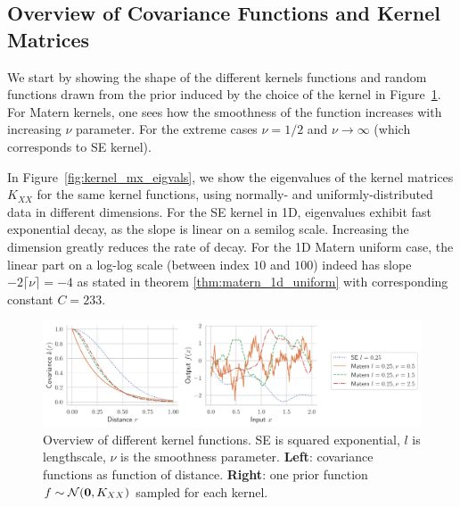 \documentclass{article}
\begin{document}
{\subsection{Overview of Covariance Functions and Kernel Matrices}

We start by showing the shape of the different kernels functions and random functions drawn from the prior induced by the choice of the kernel in Figure~\ref{fig:kernel_overview}. For Matern kernels, one sees how the smoothness of the function increases with increasing $\nu$ parameter. For the extreme cases $\nu = 1/2$ and $\nu \to \infty$ (which corresponds to SE kernel).%

In Figure~\ref{fig:kernel_mx_eigvals}, we show the eigenvalues of the kernel matrices $K_{XX}$ for the same kernel functions, using normally- and uniformly-distributed data in different dimensions. For the SE kernel in 1D, eigenvalues exhibit fast exponential decay, as the slope is linear on a semilog scale. Increasing the dimension greatly reduces the rate of decay. For the 1D Matern uniform case, the linear part on a log-log scale (between index $10$ and $100$) indeed has slope $-2\lceil \nu \rceil = -4$ as stated in theorem \ref{thm:matern_1d_uniform} with corresponding constant $C=233$. 



\begin{figure}
    \centering
    \includegraphics[width=\textwidth]{res/covariance_overview.pdf}
    \caption{Overview of different kernel functions. SE is squared exponential, $l$ is lengthscale, $\nu$ is the smoothness parameter. \textbf{Left}: covariance functions as function of distance. \textbf{Right}: one prior function $f \sim \mathcal N(\boldsymbol{\mathbf{0}}, K_{XX})$ sampled for each kernel.}
    \label{fig:kernel_overview}
\end{figure}

}
\end{document}
